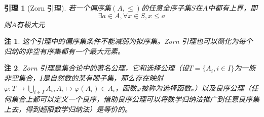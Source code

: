 \documentclass{article}                     %
\numberwithin{equation}{section}            %
\numberwithin{figure}{section}              %
\numberwithin{table}{section}               %
\newtheorem{lemma}[theorem]{\indent 引理}   %
\newtheorem{remark}{\indent 注}[section]
\begin{document}
\begin{lemma}[Zorn 引理]
    若一个偏序集$(A,\le )$的任意全序子集$S$在$A$中都有上界，即
    $$\exists a\in A,\forall x\in S,x\le a$$
    则$A$有极大元
\end{lemma}
\begin{remark}
    这个引理中的偏序集条件不能减弱为拟序集。Zorn 引理也可以简化为每个归纳的非空有序集都有一个最大元素。
\end{remark}
\begin{remark}
    Zorn 引理是集合论中的著名公理，它和选择公理（设$T=\{A_i,i\in I\}$为一族非空集合，$I$是自然数的某有限子集，那么存在映射$\varphi :T\to \bigcup _{i\in I}A_i,A_i\mapsto \varphi(A_i)\in A_i$，函数$\varphi$被称为选择函数。）以及良序公理（任何集合上都可以定义一个良序，借助良序公理可以将数学归纳法推广到任意良序集上去，得到超限数学归纳法）是等价的。
\end{remark}
\end{document}
